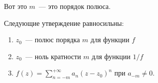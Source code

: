 \begin{definition}
    Вот это $m$~--- это порядок полюса.
\end{definition}

\begin{observation}
    Следующие утверждение равносильны:

    \begin{enumerate}
        \item $z_0$~--- полюс порядка $m$ для функции $f$
        \item $z_0$~--- ноль кратности $m$ для функции $1/f$
        \item $f(z) = \sum\limits_{n=-m}^{+\infty} a_n(z-z_0)^n$ при $a_{-m} \ne 0$.
    \end{enumerate}
\end{observation}

\newpage